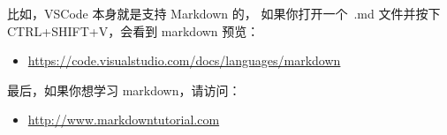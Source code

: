 比如，VSCode 本身就是支持 Markdown 的，
如果你打开一个\, .md 文件并按下 CTRL+SHIFT+V，会看到 markdown 预览：

\begin{itemize}
  \item \url{https://code.visualstudio.com/docs/languages/markdown}
\end{itemize}


最后，如果你想学习 markdown，请访问：

\begin{itemize}
  \item \url{http://www.markdowntutorial.com}
\end{itemize}

